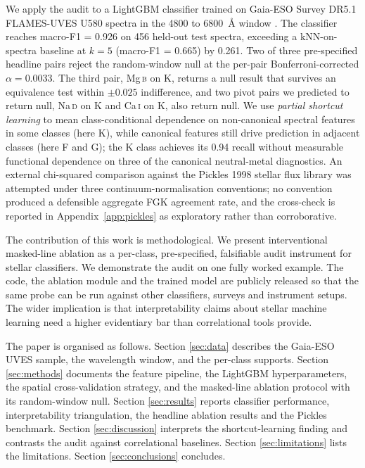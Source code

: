 \documentclass[11pt,a4paper]{article}
\newcommand{\Mgb}{Mg\,\textsc{b}\xspace}
\newcommand{\NaD}{Na\,\textsc{d}\xspace}
\newcommand{\CaI}{Ca\,\textsc{i}\xspace}
\begin{document}
We apply the audit to a LightGBM classifier \citep{Ke2017LightGBM} trained on Gaia-ESO Survey DR5.1 FLAMES-UVES U580 spectra in the 4800 to 6800~\AA{} window \citep{2014A&A...565A.113S,2023A&A...676A.129H}. The classifier reaches macro-F1 = 0.926 on 456 held-out test spectra, exceeding a kNN-on-spectra baseline at $k = 5$ (macro-F1 = 0.665) by 0.261. Two of three pre-specified headline pairs reject the random-window null at the per-pair Bonferroni-corrected $\alpha = 0.0033$. The third pair, \Mgb on K, returns a null result that survives an equivalence test within $\pm 0.025$ indifference, and two pivot pairs we predicted to return null, \NaD on K and \CaI on K, also return null. We use \emph{partial shortcut learning} to mean class-conditional dependence on non-canonical spectral features in some classes (here K), while canonical features still drive prediction in adjacent classes (here F and G); the K class achieves its 0.94 recall without measurable functional dependence on three of the canonical neutral-metal diagnostics. An external chi-squared comparison against the Pickles 1998 stellar flux library \citep{1998PASP..110..863P} was attempted under three continuum-normalisation conventions; no convention produced a defensible aggregate FGK agreement rate, and the cross-check is reported in Appendix~\ref{app:pickles} as exploratory rather than corroborative.

The contribution of this work is methodological. We present interventional masked-line ablation as a per-class, pre-specified, falsifiable audit instrument for stellar classifiers. We demonstrate the audit on one fully worked example. The code, the ablation module and the trained model are publicly released so that the same probe can be run against other classifiers, surveys and instrument setups. The wider implication is that interpretability claims about stellar machine learning need a higher evidentiary bar than correlational tools provide.

The paper is organised as follows. Section \ref{sec:data} describes the Gaia-ESO UVES sample, the wavelength window, and the per-class supports. Section \ref{sec:methods} documents the feature pipeline, the LightGBM hyperparameters, the spatial cross-validation strategy, and the masked-line ablation protocol with its random-window null. Section \ref{sec:results} reports classifier performance, interpretability triangulation, the headline ablation results and the Pickles benchmark. Section \ref{sec:discussion} interprets the shortcut-learning finding and contrasts the audit against correlational baselines. Section \ref{sec:limitations} lists the limitations. Section \ref{sec:conclusions} concludes.
\end{document}
